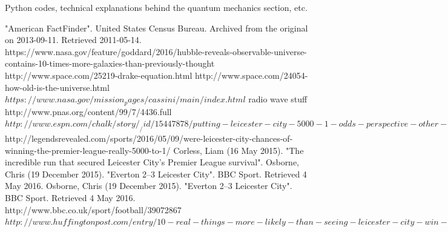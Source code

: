 \documentclass[12pt,twoside]{book}
\begin{document}
	\begin{appendices}
		Python codes, technical explanations behind the quantum mechanics section, etc.
	\end{appendices}
	\clearpage
	\begin{thebibliography}{}
		"American FactFinder". United States Census Bureau. Archived from the original on 2013-09-11. Retrieved 2011-05-14. 
		https://www.nasa.gov/feature/goddard/2016/hubble-reveals-observable-universe-contains-10-times-more-galaxies-than-previously-thought
		http://www.space.com/25219-drake-equation.html
		http://www.space.com/24054-how-old-is-the-universe.html
		$https://www.nasa.gov/mission_pages/cassini/main/index.html$
		 radio wave stuff
			http://www.pnas.org/content/99/7/4436.full
		 $http://www.espn.com/chalk/story/_/id/15447878/putting-leicester-city-5000-1-odds-perspective-other-long-shots-espn-chalk$
		http://legendsrevealed.com/sports/2016/05/09/were-leicester-city-chances-of-winning-the-premier-league-really-5000-to-1/
		 Corless, Liam (16 May 2015). "The incredible run that secured Leicester City's Premier League survival".
		Osborne, Chris (19 December 2015). "Everton 2–3 Leicester City". BBC Sport. Retrieved 4 May 2016.
		Osborne, Chris (19 December 2015). "Everton 2–3 Leicester City". BBC Sport. Retrieved 4 May 2016.
		 http://www.bbc.co.uk/sport/football/39072867
		$http://www.huffingtonpost.com/entry/10-real-things-more-likely-than-seeing-leicester-city-win-the-english-premier-league_us_5723869ae4b0f309baf0ad9d$
	\end{thebibliography}
\end{document}
